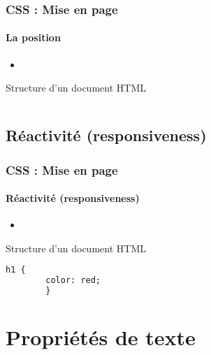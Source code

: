 \documentclass[xcolor=table]{beamer}
\begin{document}
\begin{frame}[fragile]
\frametitle{CSS : Mise en page}
\framesubtitle{La position}

\begin{minipage}{0.60\textwidth}
	\begin{itemize}
		\item 
	\end{itemize}
\end{minipage}
%
\begin{minipage}{0.38\textwidth}
	\begin{block}{Structure d'un document HTML}
		\lstset{escapeinside=**}
		\scriptsize\bfseries
\begin{lstlisting}[language={html}]

\end{lstlisting}
	\end{block}
\end{minipage}
\end{frame}


\subsection{Réactivité (responsiveness)}

\begin{frame}[fragile]
\frametitle{CSS : Mise en page}
\framesubtitle{Réactivité (responsiveness)}

\begin{minipage}{0.60\textwidth}
	\begin{itemize}
		\item 
	\end{itemize}
\end{minipage}
%
\begin{minipage}{0.38\textwidth}
	\begin{block}{Structure d'un document HTML}
		\lstset{escapeinside=**}
		\scriptsize\bfseries
		\begin{lstlisting}[language={html}]
		h1 {
		color: red;
		}
		\end{lstlisting}
	\end{block}
\end{minipage}
\end{frame}

\section{Propriétés de texte}
\end{document}
